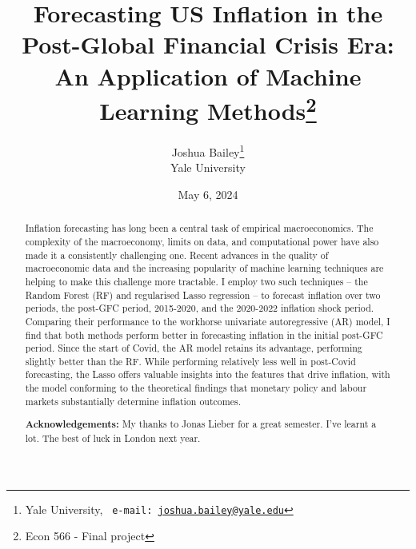 
\begin{titlepage}

\title{Forecasting US Inflation in the Post-Global Financial Crisis Era: An Application of Machine Learning Methods\footnote{Econ 566 - Final project}} 
\author{Joshua Bailey\thanks{Yale University, \texttt{\ e-mail:  \href{mailto: joshua.bailey@yale.edu}{joshua.bailey@yale.edu}}
}
\\ 
\normalsize{Yale University}
}


\date{May 6, 2024}
\maketitle
\vspace{-20pt}
\begin{abstract}
\thispagestyle{empty}

\noindent Inflation forecasting has long been a central task of empirical macroeconomics. The complexity of the macroeconomy, limits on data, and computational power have also made it a consistently challenging one. Recent advances in the quality of macroeconomic data and the increasing popularity of machine learning techniques are helping to make this challenge more tractable. I employ two such techniques -- the Random Forest (RF) and regularised Lasso regression -- to forecast inflation over two periods, the post-GFC period, 2015-2020, and the 2020-2022 inflation shock period. Comparing their performance to the workhorse univariate autoregressive (AR) model, I find that both methods perform better in forecasting inflation in the initial post-GFC period. Since the start of Covid, the AR model retains its advantage, performing slightly better than the RF. While performing relatively less well in post-Covid forecasting, the Lasso offers valuable insights into the features that drive inflation, with the model conforming to the theoretical findings that monetary policy and labour markets substantially determine inflation outcomes.  

\textbf{Acknowledgements:} My thanks to Jonas Lieber for a great semester. I've learnt a lot. The best of luck in London next year. 

\end{abstract}



\end{titlepage}


\pagebreak

\begin{singlespace}
\hypersetup{linkcolor=black}
\tableofcontents
\listoffigures
\listoftables
\hypersetup{linkcolor=blue}
\end{singlespace}


 